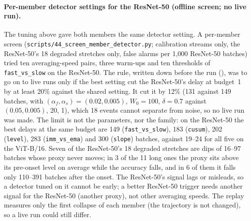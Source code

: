 \documentclass[10pt]{article}
\newcommand{\rl}[1]{\texttt{#1}}
\newcommand{\vit}{ViT-B/16}
\newcommand{\rn}{ResNet-50}
\begin{document}





\paragraph{Per-member detector settings for the \rn{} (offline screen; no live run).} The tuning above gave both members the same detector setting. A per-member screen (\rl{scripts/44\_screen\_member\_detector.py}; calibration streams only, the \rn{}'s 18 degraded stretches only, false alarms per 1,000 \rn{} batches) tried ten averaging-speed pairs, three warm-ups and ten thresholds of \rl{fast\_vs\_slow} on the \rn{}. The rule, written down before the run (), was to go on to live runs only if the best setting cut the \rn{}'s delay at budget~1 by at least 20\% against the shared setting. It cut it by 12\% (131 against 149 batches, with $(\alpha_f, \alpha_s) = (0.02, 0.005)$, $W_0 = 100$, $\delta = 0.7$ against $(0.05, 0.005)$, 20, 1), which 18 events cannot separate from noise, so no live run was made. The limit is not the parameters, nor the family: on the \rn{} the best delays at the same budget are 149 (\rl{fast\_vs\_slow}), 183 (\rl{cusum}), 202 (\rl{level}), 283 (\rl{imm\_vs\_ema}) and 300 (\rl{slope}) batches, against 19--24 for all five on the \vit{}. Seven of the \rn{}'s 18 degraded stretches are dips of 16--97 batches whose proxy never moves; in 3 of the 11 long ones the proxy sits above its pre-onset level on average while the accuracy falls, and in 6 of them it falls only 110--391 batches after the onset. The \rn{}'s signal lags or misleads, so a detector tuned on it cannot be early; a better \rn{} trigger needs another signal for the \rn{} (another proxy), not other averaging speeds. The replay measures only the first collapse of each member (the trajectory is not changed), so a live run could still differ.
\end{document}
